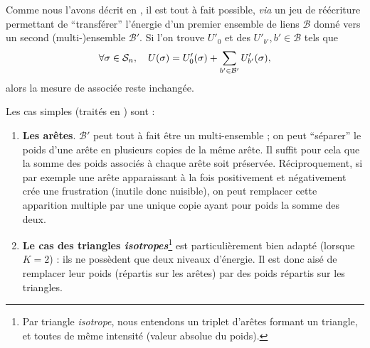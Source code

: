Comme nous l'avons décrit en \cite{BibiMonterey}, il est tout à fait possible, \emph{via} un jeu de réécriture permettant de ``transférer'' l'énergie d'un premier ensemble de liens $\mathcal B$ donné vers un second (multi-)ensemble $\mathcal B'$. Si l'on trouve $U'_0$ et des $U'_{b'}, b' \in \mathcal B$ tels que 
\[
\forall \sigma \in \Conf_n, \ \ \ U(\sigma) = U_0'(\sigma) + \sum_{b' \in \mathcal B'} U'_{b'}(\sigma),
\]
alors la mesure de  associée reste inchangée.

Les cas simples (traités en \cite{BibiMonterey}) sont :
\begin{enumerate}
    \item \textbf{Les arêtes}. $\mathcal B'$ peut tout à fait être un multi-ensemble ; on peut ``séparer'' le poids d'une arête en plusieurs copies de la même arête. Il suffit pour cela que la somme des poids associés à chaque arête soit préservée. Réciproquement, si par exemple une arête apparaissant à la fois positivement et négativement crée une frustration (inutile donc nuisible), on peut remplacer cette apparition multiple par une unique copie ayant pour poids la somme des deux.
    \item \textbf{Le cas des triangles \emph{isotropes}}\footnote{Par triangle \emph{isotrope}, nous entendons un triplet d'arêtes formant un triangle, et toutes de même intensité (valeur absolue du poids).}  est particulièrement bien adapté (lorsque $K=2$) : ils ne possèdent que deux niveaux d'énergie. Il est donc aisé de remplacer leur poids (répartis sur les arêtes) par des poids répartis sur les triangles.
\end{enumerate}





